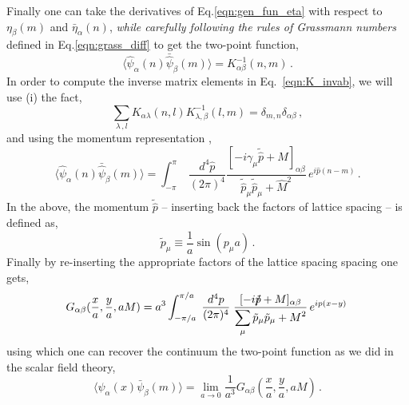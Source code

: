 \documentclass[11pt]{article}
\newcommand{\sideex}[1]{\marginnote{\footnotesize\textcolor{red!50!black}{#1}}}
\theoremstyle{definition}
\begin{document}
Finally one can take the derivatives of Eq.\eqref{eqn:gen_fun_eta} with respect to $\eta_{\beta}(m)$ and $\bar{\eta}_{\alpha}(n)$, \textit{while carefully following the rules of Grassmann numbers} defined in Eq.\eqref{eqn:grass_diff} to get the two-point function,
\begin{equation}\label{eqn:K_invab}
    \langle \hat{\psi}_{\alpha}(n) \bar{\hat{\psi}}_{\beta}(m) \rangle = K^{-1}_{\alpha \beta}(n,m)\,.
\end{equation}
In order to compute the inverse matrix elements in Eq.~\eqref{eqn:K_invab}, we will use (i) the fact,
\begin{equation}
    \displaystyle\sum_{\lambda\,,l} K_{\alpha \lambda}(n,l) K^{-1}_{\lambda,\beta}(l,m) = \delta_{m,n}\delta_{\alpha \beta} \,,
\end{equation}
and using the momentum representation \sideex{There is an exercise to show the form of the lattice momentum!},
\begin{equation}\label{eqn:2ptfunc}
    \langle \hat{\psi}_{\alpha}(n) \bar{\hat{\psi}}_{\beta}(m) \rangle = \displaystyle\int^{\pi}_{-\pi} \; \frac{d^4\hat{p}}{(2 \pi)^4} \frac{[-i \gamma_{\mu} \tilde{\hat{p}} + M]_{\alpha \beta}}{\tilde{\hat{p}}_{\mu}\tilde{\hat{p}}_{\mu} + \hat{M}^2} \, e^{i \hat{p}(n-m)} \,.
\end{equation}
In the above, the momentum $\tilde{\hat{p}}$ -- inserting back the factors of lattice spacing -- is defined as,
\begin{equation}\label{eqn:fer_lat_mom}
    \tilde{p}_{\mu} \equiv \frac{1}{a} \sin(p_{\mu}a) \,.
\end{equation}
Finally by re-inserting the appropriate factors of the lattice spacing spacing one gets\sideex{You are encouraged to check the factors!},
\begin{equation}\label{eqn:corr_fer_units}
    G_{\alpha \beta}(\frac{x}{a},\frac{y}{a},aM) = a^3 \displaystyle\int^{\pi/a}_{-\pi/a} \; \frac{d^4p}{(2 \pi)^4} \; \frac{[-i\slashed{\tilde{p}} + M]_{\alpha \beta}}{\displaystyle\sum_{\mu} \tilde{p}_{\mu} \tilde{p}_{\mu} + M^2} \, e^{i p (x-y)} \,
\end{equation}
using which one can recover the continuum the two-point function as we did in the scalar field theory,
\begin{equation}\label{eqn:twoP_G}
    \langle \psi_{\alpha}(x) \bar{\psi}_{\beta}(m) \rangle = \lim_{a \to 0} \frac{1}{a^3} G_{\alpha \beta}\left(\frac{x}{a},\frac{y}{a},aM\right) \,.
\end{equation}
\end{document}
